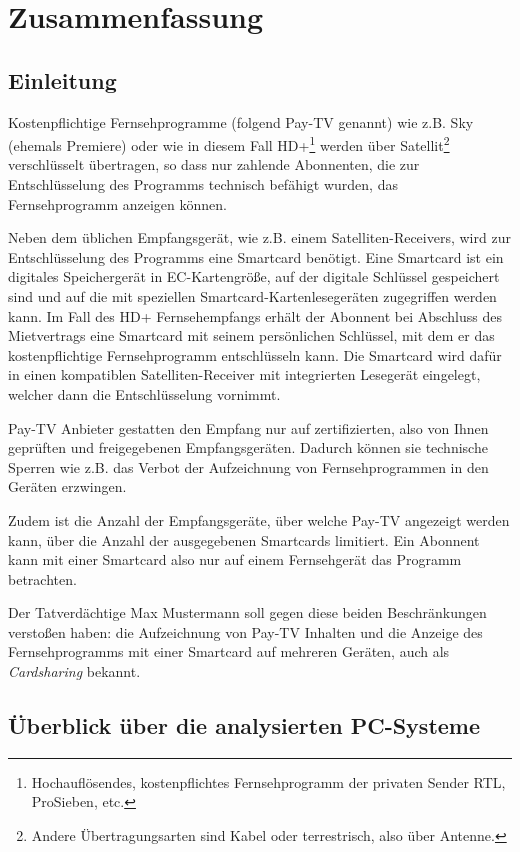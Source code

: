 \chapter{Zusammenfassung}
\label{cap:summary}

\section{Einleitung}
\label{sec:introduction}

Kostenpflichtige Fernsehprogramme (folgend Pay-TV genannt) wie z.B. Sky (ehemals Premiere) oder wie in diesem Fall HD+\footnote{Hochauflösendes, kostenpflichtes Fernsehprogramm der privaten Sender RTL, ProSieben, etc.} werden über Satellit\footnote{Andere Übertragungsarten sind Kabel oder terrestrisch, also über Antenne.} verschlüsselt übertragen, so dass nur zahlende Abonnenten, die zur Entschlüsselung des Programms technisch befähigt wurden, das Fernsehprogramm anzeigen können.

Neben dem üblichen Empfangsgerät, wie z.B. einem Satelliten-Receivers, wird zur Entschlüsselung des Programms eine Smartcard benötigt. Eine Smartcard ist ein digitales Speichergerät in EC-Kartengröße, auf der digitale Schlüssel gespeichert sind und auf die mit speziellen Smartcard-Kartenlesegeräten zugegriffen werden kann. Im Fall des HD+ Fernsehempfangs erhält der Abonnent bei Abschluss des Mietvertrags eine Smartcard mit seinem persönlichen Schlüssel, mit dem er das kostenpflichtige Fernsehprogramm entschlüsseln kann. Die Smartcard wird dafür in einen kompatiblen Satelliten-Receiver mit integrierten Lesegerät eingelegt, welcher dann die Entschlüsselung vornimmt.

Pay-TV Anbieter gestatten den Empfang nur auf zertifizierten, also von Ihnen geprüften und freigegebenen Empfangsgeräten. Dadurch können sie technische Sperren wie z.B. das Verbot der Aufzeichnung von Fernsehprogrammen in den Geräten erzwingen.

Zudem ist die Anzahl der Empfangsgeräte, über welche Pay-TV angezeigt werden kann, über die Anzahl der ausgegebenen Smartcards limitiert. Ein Abonnent kann mit einer Smartcard also nur auf einem Fernsehgerät das Programm betrachten.

Der Tatverdächtige Max Mustermann soll gegen diese beiden Beschränkungen verstoßen haben: die Aufzeichnung von Pay-TV Inhalten und die Anzeige des Fernsehprogramms mit einer Smartcard auf mehreren Geräten, auch als \textit{Cardsharing} bekannt.

\section{Überblick über die analysierten PC-Systeme}
\label{sec:summary-overview}

